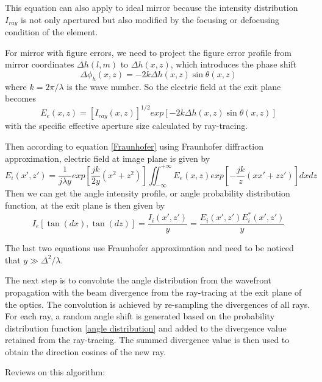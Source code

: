 \documentclass[../main.tex]{subfiles}
\begin{document}
	This equation can also apply to ideal mirror because the intensity distribution $I_{ray}$ is not only apertured but also modified by the focusing or defocusing condition of the element.

	For mirror with figure errors, we need to project the figure error profile from mirror coordinates $\Delta h(l,m)$ to $\Delta h(x,z)$, which introduces the phase shift
	\begin{equation}
	\Delta \phi_h(x,z)=-2k\Delta h(x,z)\sin\theta(x,z)
	\end{equation}
	where $k=2\pi/\lambda$ is the wave number. So the electric field at the exit plane becomes
	\begin{equation}
	E_e(x,z)=[I_{ray}(x,z)]^{1/2}exp[-2k\Delta h(x,z)\sin\theta(x,z)]
	\end{equation}
	with the specific effective aperture size calculated by ray-tracing.

	Then according to equation \ref{Fraunhofer} using Fraunhofer diffraction approximation, electric field at image plane is given by
	\begin{equation}
	E_i(x',z')=\frac{1}{j\lambda y}exp\left[\frac{jk}{2y}(x^2+z^2)\right]\iint_{-\infty}^{+\infty} E_e(x,z)exp\left[-\frac{jk}{z}(xx'+zz')\right]dxdz
	\end{equation}
	Then we can get the angle intensity profile, or angle probability distribution function, at the exit plane is then given by
	\begin{equation}
	I_e[\tan(dx),\tan(dz)]=\frac{I_i(x',z')}{y}=\frac{E_i(x',z')E_i^*(x',z')}{y}\label{angle distribution}
	\end{equation}

	The last two equations use Fraunhofer approximation and need to be noticed that $y\gg \Delta^2/\lambda$.

	The next step is to convolute the angle distribution from the wavefront propagation with the beam divergence from the ray-tracing at the exit plane of the optics. The convolution is achieved by re-sampling the divergences of all rays. For each ray, a random angle shift is generated based on the probability distribution function \ref{angle distribution} and added to the divergence value retained from the ray-tracing. The summed divergence value is then used to obtain the direction cosines of the new ray.

	Reviews on this algorithm:
\end{document}
